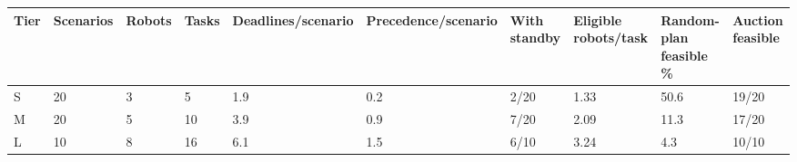\begin{tabular}{llllllllll}
\toprule
Tier & Scenarios & Robots & Tasks & Deadlines/scenario & Precedence/scenario & With standby & Eligible robots/task & Random-plan feasible \% & Auction feasible \\
\midrule
S & 20 & 3 & 5 & 1.9 & 0.2 & 2/20 & 1.33 & 50.6 & 19/20 \\
M & 20 & 5 & 10 & 3.9 & 0.9 & 7/20 & 2.09 & 11.3 & 17/20 \\
L & 10 & 8 & 16 & 6.1 & 1.5 & 6/10 & 3.24 & 4.3 & 10/10 \\
\bottomrule
\end{tabular}
